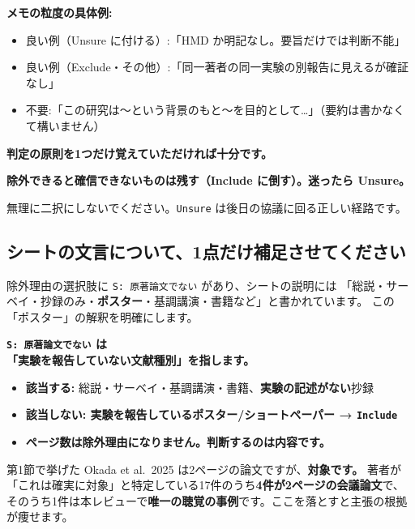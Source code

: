 \documentclass[a4paper]{ltjsarticle}
\newcommand{\keybox}[1]{%
  \par\medskip
  \noindent\colorbox{soft}{%
    \begin{minipage}{\dimexpr\linewidth-2\fboxsep\relax}
      \vspace{2pt}\centering\bfseries\large #1\vspace{4pt}
    \end{minipage}}%
  \par\medskip}
\begin{document}
\noindent
\textbf{メモの粒度の具体例:}

\begin{itemize}
  \item 良い例（Unsure に付ける）:「HMD か明記なし。要旨だけでは判断不能」
  \item 良い例（Exclude・その他）:「同一著者の同一実験の別報告に見えるが確証なし」
  \item 不要:「この研究は〜という背景のもと〜を目的として\ldots」（要約は書かなくて構いません）
\end{itemize}

\noindent
\textbf{判定の原則を1つだけ覚えていただければ十分です。}

\keybox{除外できると確信できないものは残す（Include に倒す）。迷ったら Unsure。}

\noindent
無理に二択にしないでください。\texttt{Unsure} は後日の協議に回る正しい経路です。

\subsection{シートの文言について、1点だけ補足させてください}

除外理由の選択肢に \texttt{S: 原著論文でない} があり、シートの説明には
「総説・サーベイ・抄録のみ・\textbf{ポスター}・基調講演・書籍など」と書かれています。
この「ポスター」の解釈を明確にします。

\par\medskip
\noindent
\begin{minipage}{\linewidth}
\keybox{\texttt{S: 原著論文でない} は\\「\textbf{実験を報告していない}文献種別」を指します。}
\begin{itemize}
  \item \textbf{該当する:} 総説・サーベイ・基調講演・書籍、\textbf{実験の記述がない}抄録
  \item \textbf{該当しない: 実験を報告しているポスター/ショートペーパー → \texttt{Include}}
  \item \textbf{ページ数は除外理由になりません。判断するのは内容です。}
\end{itemize}
\end{minipage}

\medskip
\noindent
第1節で挙げた Okada et al.\ 2025 は2ページの論文ですが、\textbf{対象です。}
著者が「これは確実に対象」と特定している17件のうち\textbf{4件が2ページの会議論文}で、
そのうち1件は本レビューで\textbf{唯一の聴覚の事例}です。ここを落とすと主張の根拠が痩せます。
\end{document}
